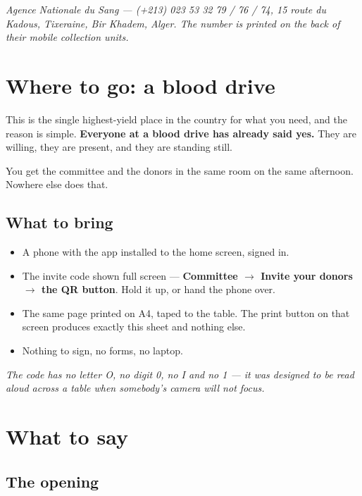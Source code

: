 \documentclass[11pt,a4paper]{article}
\newcommand{\note}[1]{{\small\color{qatraGrey}\textit{#1}}}
\begin{document}
\note{Agence Nationale du Sang --- (+213) 023 53 32 79 / 76 / 74, 15 route du
Kadous, Tixeraine, Bir Khadem, Alger. The number is printed on the back of
their mobile collection units.}

\section{Where to go: a blood drive}

This is the single highest-yield place in the country for what you need, and
the reason is simple. \textbf{Everyone at a blood drive has already said yes.}
They are willing, they are present, and they are standing still.

You get the committee and the donors in the same room on the same afternoon.
Nowhere else does that.

\subsection{What to bring}

\begin{itemize}[leftmargin=1.4em]
  \item A phone with the app installed to the home screen, signed in.
  \item The invite code shown full screen --- \textbf{Committee $\rightarrow$
        Invite your donors $\rightarrow$ the QR button}. Hold it up, or hand
        the phone over.
  \item The same page printed on A4, taped to the table. The print button on
        that screen produces exactly this sheet and nothing else.
  \item Nothing to sign, no forms, no laptop.
\end{itemize}

\note{The code has no letter O, no digit 0, no I and no 1 --- it was designed to
be read aloud across a table when somebody's camera will not focus.}

\section{What to say}

\subsection{The opening}
\end{document}
